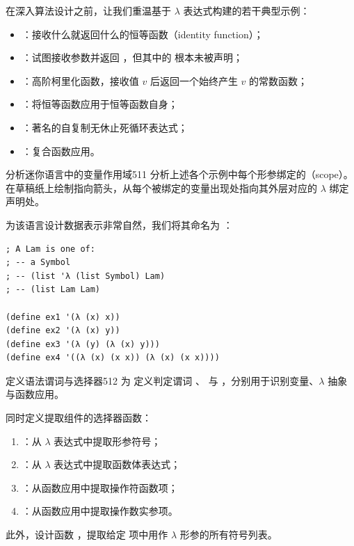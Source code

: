在深入算法设计之前，让我们重温基于 $\lambda$ 表达式构建的若干典型示例：
\begin{itemize}
  \item {}：接收什么就返回什么的恒等函数（identity function）；
  \item {}：试图接收参数并返回 ，但其中的  根本未被声明；
  \item {}：高阶柯里化函数，接收值 $v$ 后返回一个始终产生 $v$ 的常数函数；
  \item {}：将恒等函数应用于恒等函数自身；
  \item {}：著名的自复制无休止死循环表达式；
  \item {}：复合函数应用。
\end{itemize}

\begin{exercise}{分析迷你语言中的变量作用域}{511}
分析上述各个示例中每个形参绑定的（scope）。在草稿纸上绘制指向箭头，从每个被绑定的变量出现处指向其外层对应的 $\lambda$ 绑定声明处。
\end{exercise}

为该语言设计数据表示非常自然，我们将其命名为 ：

\begin{lstlisting}[language=BSL]
; A Lam is one of:
; -- a Symbol
; -- (list 'λ (list Symbol) Lam)
; -- (list Lam Lam)

(define ex1 '(λ (x) x))
(define ex2 '(λ (x) y))
(define ex3 '(λ (y) (λ (x) y)))
(define ex4 '((λ (x) (x x)) (λ (x) (x x))))
\end{lstlisting}

\begin{exercise}{定义语法谓词与选择器}{512}
为  定义判定谓词 、 与 ，分别用于识别变量、$\lambda$ 抽象与函数应用。

同时定义提取组件的选择器函数：
\begin{enumerate}
  \item {}：从 $\lambda$ 表达式中提取形参符号；
  \item {}：从 $\lambda$ 表达式中提取函数体表达式；
  \item {}：从函数应用中提取操作符函数项；
  \item {}：从函数应用中提取操作数实参项。
\end{enumerate}
此外，设计函数 ，提取给定  项中用作 $\lambda$ 形参的所有符号列表。
\end{exercise}

